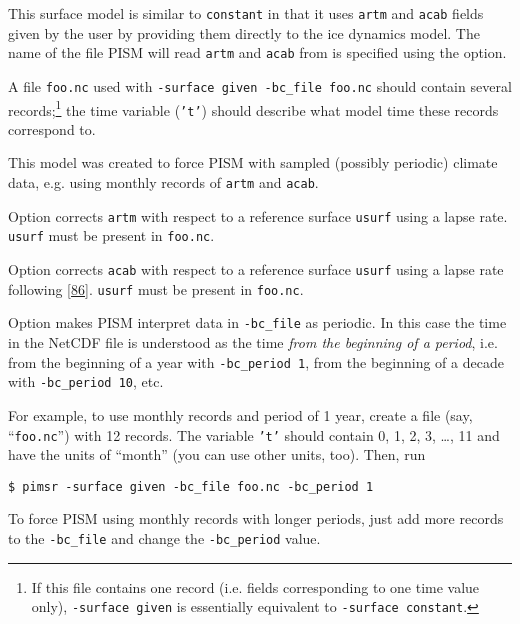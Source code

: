 \begin{itemize}
    This surface model is similar to \texttt{constant} in that it uses \texttt{artm} and \texttt{acab} fields given by the user by providing them directly to the ice dynamics model. The name of the file PISM will read \texttt{artm} and \texttt{acab} from is specified using the  option.

    A file \texttt{foo.nc} used with \texttt{-surface given -bc_file foo.nc} should contain several records;\footnote{If this file contains one record (i.e. fields corresponding to one time value only), \texttt{-surface given} is essentially equivalent to \texttt{-surface constant}.} the time variable (\texttt{'t'}) should describe what model time these records correspond to.

    This model was created to force PISM with sampled (possibly periodic) climate data, e.g. using monthly records of \texttt{artm} and \texttt{acab}.

 Option  corrects \texttt{artm} with respect to a reference surface \texttt{usurf} using a lapse rate. \texttt{usurf} must be present in \texttt{foo.nc}.

 Option  corrects \texttt{acab} with respect to a reference surface \texttt{usurf} using a lapse rate following [\href{http://www.truenuff.tv/glacierrace.php}{86}]. \texttt{usurf} must be present in \texttt{foo.nc}.

Option  makes PISM interpret data in \texttt{-bc_file} as periodic. In this case the time in the NetCDF file is understood as the time \emph{from the beginning of a period}, i.e. from the beginning of a year with \texttt{-bc_period 1}, from the beginning of a decade with \texttt{-bc_period 10}, etc.

For example, to use monthly records and period of 1 year, create a file (say, ``\texttt{foo.nc}'') with 12 records. The variable \texttt{'t'} should contain 0, 1, 2, 3, \dots, 11 and have the units of ``month'' (you can use other units, too). Then, run
\begin{verbatim}
$ pimsr -surface given -bc_file foo.nc -bc_period 1
\end{verbatim}%

To force PISM using monthly records with longer periods, just add more records to the \texttt{-bc_file}  and change the \texttt{-bc_period} value.


\end{itemize}
